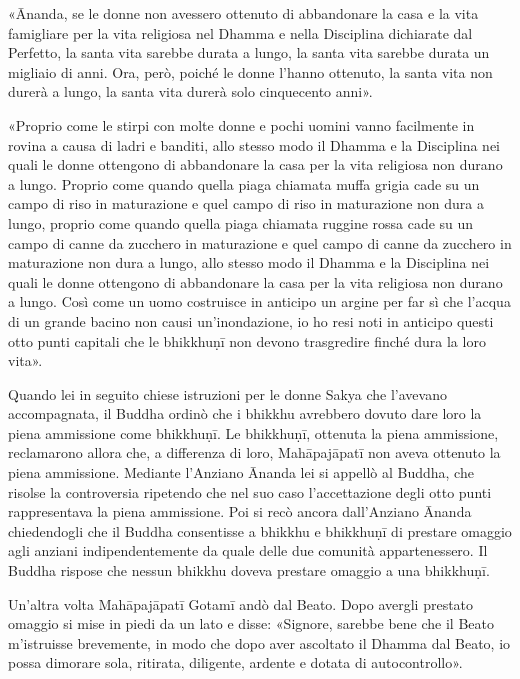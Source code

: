 «Ānanda, se le donne non avessero ottenuto di abbandonare la casa e la vita
famigliare per la vita religiosa nel Dhamma e nella Disciplina dichiarate dal
Perfetto, la santa vita sarebbe durata a lungo, la santa vita sarebbe durata un
migliaio di anni. Ora, però, poiché le donne l’hanno ottenuto, la santa vita non
durerà a lungo, la santa vita durerà solo cinquecento anni».

«Proprio come le stirpi con molte donne e pochi uomini vanno facilmente in
rovina a causa di ladri e banditi, allo stesso modo il Dhamma e la Disciplina
nei quali le donne ottengono di abbandonare la casa per la vita religiosa non
durano a lungo. Proprio come quando quella piaga chiamata muffa grigia cade su
un campo di riso in maturazione e quel campo di riso in maturazione non dura a
lungo, proprio come quando quella piaga chiamata ruggine rossa cade su un campo
di canne da zucchero in maturazione e quel campo di canne da zucchero in
maturazione non dura a lungo, allo stesso modo il Dhamma e la Disciplina nei
quali le donne ottengono di abbandonare la casa per la vita religiosa non durano
a lungo. Così come un uomo costruisce in anticipo un argine per far sì che
l’acqua di un grande bacino non causi un’inondazione, io ho resi noti in
anticipo questi otto punti capitali che le bhikkhuṇī non devono trasgredire
finché dura la loro vita».


 Quando lei in seguito chiese istruzioni per le
donne Sakya che l’avevano accompagnata, il Buddha ordinò che i bhikkhu avrebbero
dovuto dare loro la piena ammissione come bhikkhuṇī. Le bhikkhuṇī, ottenuta la
piena ammissione, reclamarono allora che, a differenza di loro, Mahāpajāpatī non
aveva ottenuto la piena ammissione. Mediante l’Anziano Ānanda lei si appellò al
Buddha, che risolse la controversia ripetendo che nel suo caso l’accettazione
degli otto punti rappresentava la piena ammissione. Poi si recò ancora
dall’Anziano Ānanda chiedendogli che il Buddha consentisse a bhikkhu e bhikkhuṇī
di prestare omaggio agli anziani indipendentemente da quale delle due comunità
appartenessero. Il Buddha rispose che nessun bhikkhu doveva prestare omaggio a
una bhikkhuṇī.

 Un’altra volta Mahāpajāpatī Gotamī andò dal Beato. Dopo
avergli prestato omaggio si mise in piedi da un lato e disse: «Signore, sarebbe
bene che il Beato m’istruisse brevemente, in modo che dopo aver ascoltato il
Dhamma dal Beato, io possa dimorare sola, ritirata, diligente, ardente e dotata
di autocontrollo».

